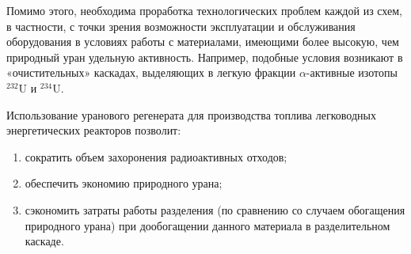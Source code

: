 Помимо этого, необходима проработка технологических проблем каждой из схем, в частности, с точки зрения возможности эксплуатации и обслуживания оборудования в условиях работы с материалами, имеющими более высокую, чем природный уран удельную активность. Например, подобные условия возникают в «очистительных» каскадах, выделяющих в легкую фракции $\alpha$-активные изотопы $^{232}$U и $^{234}$U. 



Использование уранового регенерата для производства топлива легководных энергетических реакторов позволит: 
\begin{enumerate}
  \item сократить объем захоронения радиоактивных отходов; 
  \item обеспечить экономию природного урана;
  \item сэкономить затраты работы разделения (по сравнению со случаем обогащения природного урана) при дообогащении данного материала в разделительном каскаде. 
\end{enumerate}








